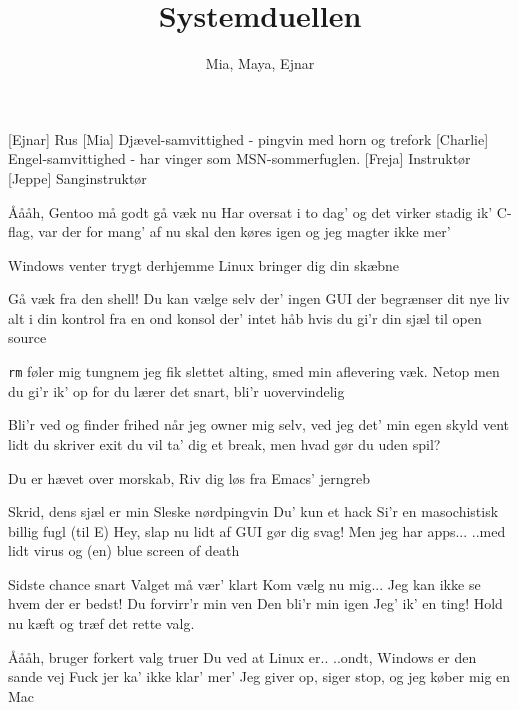 \documentclass[a4paper,11pt]{article}
\title{Systemduellen}
\author{Mia, Maya, Ejnar}
\begin{document}
\maketitle

\begin{roles}
[Ejnar] Rus
[Mia] Djævel-samvittighed - pingvin med horn og trefork
[Charlie] Engel-samvittighed - har vinger som MSN-sommerfuglen.
[Freja] Instruktør
[Jeppe] Sanginstruktør
\end{roles}

\begin{song}

 Åååh, Gentoo
må godt gå væk nu
Har oversat i to dag' og det virker stadig ik'
C-flag,
var der for mang' af
nu skal den køres igen og jeg magter ikke mer'


 Windows venter trygt derhjemme
 Linux bringer dig din skæbne

 Gå væk fra den shell!
 Du kan vælge selv
 der' ingen GUI der begrænser dit nye liv
 alt i din kontrol
 fra en ond konsol
 der' intet håb hvis du gi'r din sjæl til open source

 \texttt{rm}
føler mig tungnem
jeg fik slettet alting, smed min aflevering væk.
 Netop
men du gi'r ik' op
for du lærer det snart, bli'r uovervindelig

 Bli'r ved
og finder frihed
når jeg owner mig selv, ved jeg det' min egen skyld
 vent lidt
du skriver exit
du vil ta' dig et break, men hvad gør du uden spil?

 Du er hævet over morskab,
 Riv dig løs fra Emacs' jerngreb

 Skrid, dens sjæl er min
 Sleske nørdpingvin
 Du' kun et hack
 Si'r en masochistisk billig fugl
 (til E) Hey, slap nu lidt af
 GUI gør dig svag!
 Men jeg har apps...
 ..med lidt virus og (en) blue screen of death



 Sidste chance snart
 Valget må vær' klart
 Kom vælg nu mig...
 Jeg kan ikke se hvem der er bedst!
 Du forvirr'r min ven
 Den bli'r min igen
 Jeg' ik' en ting!
 Hold nu kæft og træf det rette valg.


 Åååh, bruger
forkert valg truer
 Du ved at Linux er..
 ..ondt, Windows er den sande vej
 Fuck jer
ka' ikke klar' mer'
Jeg giver op, siger stop, og jeg køber mig en Mac

\end{song}
\end{document}
